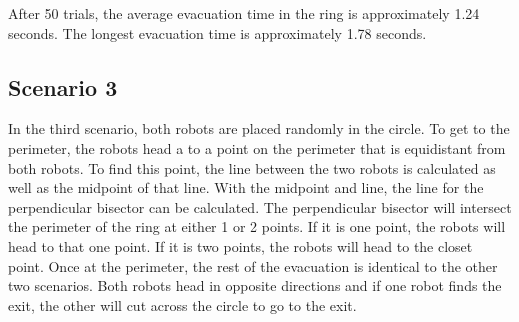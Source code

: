 \documentclass[12pt,letterpaper]{article}
\begin{document}
        After 50 trials, the average evacuation time in the ring is approximately 1.24 seconds. The longest evacuation time is approximately 1.78 seconds.

    \subsection{Scenario 3}
        In the third scenario, both robots are placed randomly in the circle. To get to the perimeter, the robots head a to a point on the perimeter that is equidistant from both robots. To find this point, the line between the two robots is calculated as well as the midpoint of that line. With the midpoint and line, the line for the perpendicular bisector can be calculated. The perpendicular bisector will intersect the perimeter of the ring at either 1 or 2 points. If it is one point, the robots will head to that one point. If it is two points, the robots will head to the closet point. Once at the perimeter, the rest of the evacuation is identical to the other two scenarios. Both robots head in opposite directions and if one robot finds the exit, the other will cut across the circle to go to the exit.
        
\end{document}
